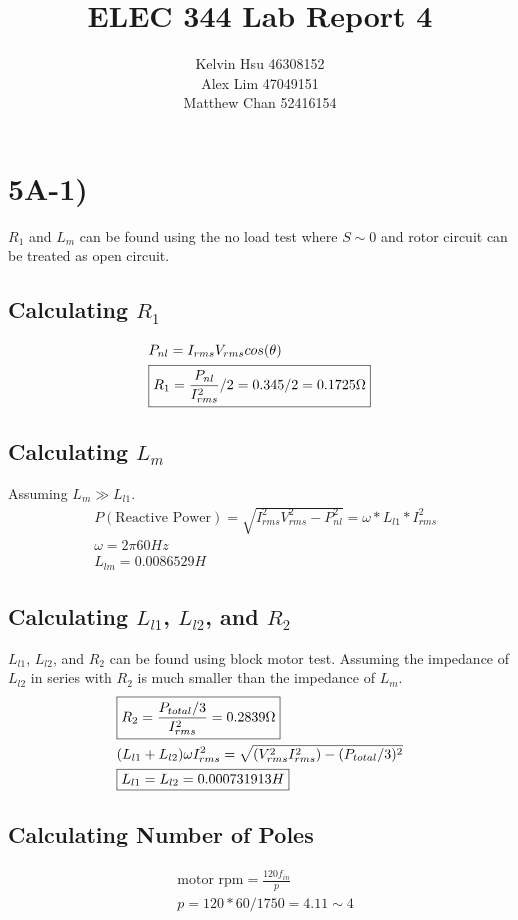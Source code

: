 \documentclass{article}
\title{ELEC 344 Lab Report 4}
\author{Kelvin Hsu 46308152\\ Alex Lim 47049151\\ Matthew Chan 52416154}
\begin{document}
    \sffamily
   	\maketitle
    \newpage

    \section*{5A-1)}
    $R_{1}$ and $L_{m}$ can be found using the no load test where $S \sim 0$ and rotor circuit can be treated as 
    open circuit.
    \subsection*{Calculating $R_{1}$}
       \begin{align*} 
            &P_{nl} = I_{rms}V_{rms}cos(\theta)\\
            &\boxed{R_{1} = \frac{P_{nl}}{I_{rms}^{2}}/2 = 0.345/2 = 0.1725 \ohm}
       \end{align*}

    \subsection*{Calculating $L_{m}$}
       Assuming $L_{m} \gg L_{l1}$.
       \begin{align*}
            &P(\text{Reactive Power}) = \sqrt{I_{rms}^{2}V_{rms}^{2} - P_{nl}^{2}} = \omega*L_{l1}*I_{rms}^{2}\\
            &\omega = 2 \pi 60Hz\\
            &\boxed{L_{lm} = 0.0086529H}
       \end{align*}
    \subsection*{Calculating $L_{l1}$, $L_{l2}$, and $R_{2}$}
    $L_{l1}$, $L_{l2}$, and $R_{2}$ can be found using block motor test.
    Assuming the impedance of $L_{l2}$ in series with $R_{2}$ is much smaller than the impedance of $L_{m}$.
       \begin{align*}
            &\boxed{R_{2} = \frac{P_{total}/3}{I_{rms}^{2}} = 0.2839\ohm}\\
            &(L_{l1} + L_{l2})\omega I_{rms}^{2} = \sqrt{(V_{rms}^{2}I_{rms}^{2}) - (P_{total}/3)^{2}}\\
            &\boxed{L_{l1} = L_{l2} = 0.000731913H}
       \end{align*}

    \subsection*{Calculating Number of Poles}
       \begin{align*}
            &\text{motor rpm} = \frac{120f_{in}}{p}\\
            &p = 120*60/1750 = 4.11 \sim 4
       \end{align*}
\end{document}
